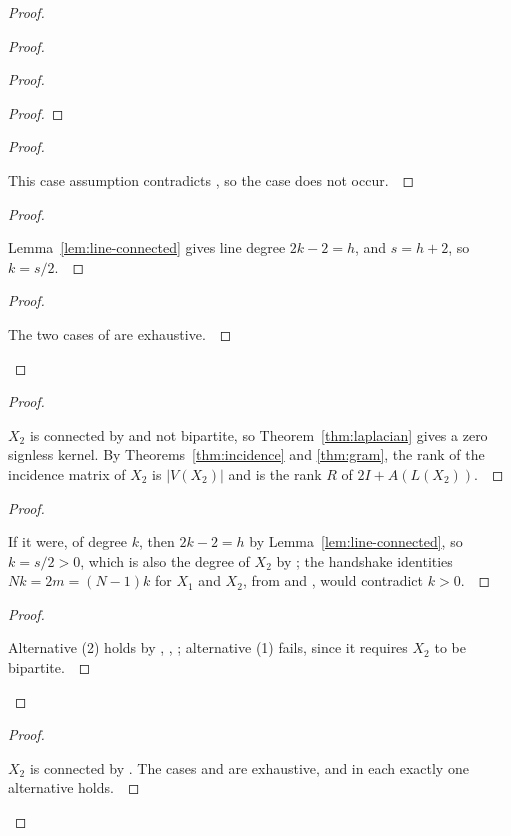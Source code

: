 \documentclass[11pt]{amsart}
\let\qed\relax
\theoremstyle{definition}
\begin{document}
\begin{proof}
\begin{proof}
\begin{proof}
\begin{proof}
\end{proof}
\begin{proof}
\pf\ \raggedright This case assumption contradicts , so the case does not occur.~\qed
\end{proof}
\begin{proof}
\pf\ \raggedright Lemma~\ref{lem:line-connected} gives line degree $2k-2=h$, and $s=h+2$, so $k=s/2$.~\qed
\end{proof}
\qedstep
\begin{proof}
\pf\ \raggedright The two cases of  are exhaustive.~\qed
\end{proof}
\end{proof}
\begin{proof}
\pf\ \raggedright $X_2$ is connected by  and not bipartite, so Theorem~\ref{thm:laplacian} gives a zero signless kernel. By Theorems~\ref{thm:incidence} and \ref{thm:gram}, the rank of the incidence matrix of $X_2$ is $|V(X_2)|$ and is the rank $R$ of $2I+A(L(X_2))$.~\qed
\end{proof}
\begin{proof}
\pf\ \raggedright If it were, of degree $k$, then $2k-2=h$ by Lemma~\ref{lem:line-connected}, so $k=s/2>0$, which is also the degree of $X_2$ by ; the handshake identities $Nk=2m=(N-1)k$ for $X_1$ and $X_2$, from  and , would contradict $k>0$.~\qed
\end{proof}
\qedstep
\begin{proof}
\pf\ \raggedright Alternative (2) holds by , , ; alternative (1) fails, since it requires $X_2$ to be bipartite.~\qed
\end{proof}
\end{proof}
\qedstep
\begin{proof}
\pf\ \raggedright $X_2$ is connected by . The cases  and  are exhaustive, and in each exactly one alternative holds.~\qed
\end{proof}
\end{proof}
\end{document}
